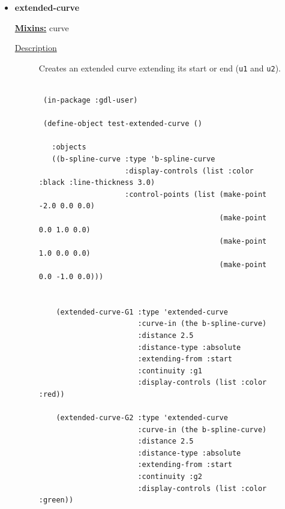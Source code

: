 \documentclass [11pt]{book}
\begin{document}
\begin{itemize}
\begin{figure}
\end{figure}






\item {}
\label{prim:extended-curve}
\textbf{extended-curve}


\textbf{
\underline{Mixins:}} curve





\begin{description}

\item [
\underline{Description}]


Creates an extended curve extending its start or end  (\texttt{u1} and \texttt{u2}).



\end{description}




\begin{figure}
\begin{lrbox}{\boxedverb}
\begin{minipage}{\linewidth}
{\small

\begin{verbatim}
  
 (in-package :gdl-user)

 (define-object test-extended-curve ()

   :objects
   ((b-spline-curve :type 'b-spline-curve
                    :display-controls (list :color :black :line-thickness 3.0)
                    :control-points (list (make-point -2.0 0.0 0.0)
                                          (make-point  0.0 1.0 0.0) 
                                          (make-point  1.0 0.0 0.0) 
                                          (make-point  0.0 -1.0 0.0))) 
                                           
    
    (extended-curve-G1 :type 'extended-curve
                       :curve-in (the b-spline-curve)
                       :distance 2.5
                       :distance-type :absolute
                       :extending-from :start
                       :continuity :g1
                       :display-controls (list :color :red))
    
    (extended-curve-G2 :type 'extended-curve
                       :curve-in (the b-spline-curve)
                       :distance 2.5
                       :distance-type :absolute
                       :extending-from :start
                       :continuity :g2
                       :display-controls (list :color :green))
    

\end{verbatim}}
\end{minipage}
\end{lrbox}
\end{figure}
\end{itemize}
\end{document}
